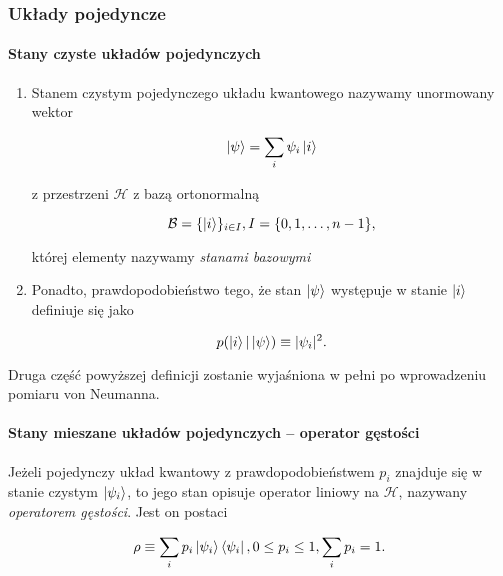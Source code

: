 \subsubsection{Układy pojedyncze}

\paragraph{Stany czyste układów pojedynczych}

\begin{definition}
    \strut
    \begin{enumerate}
        \item Stanem czystym pojedynczego układu kwantowego nazywamy unormowany wektor

            $$
                \ket{\psi} = \sum\limits_{i} \psi_{i} \ket{i}
            $$
 
            z przestrzeni $\mathcal{H}$ z bazą ortonormalną

            $$
                \mathcal{B} = \{\ket{i}\}_{i \in I}, I = \{0, 1, \ldots, n - 1\},
            $$

            której elementy nazywamy \textit{stanami bazowymi}

        \item Ponadto, prawdopodobieństwo tego, że stan $\ket{\psi}$ występuje w stanie $\ket{i}$ definiuje się jako

            \begin{equation}
                \label{equation:finding}
                p(\ket{i}|\ket{\psi}) \equiv |\psi_i| ^ 2.
            \end{equation}
    \end{enumerate}
\end{definition}

\begin{remark}
    Druga część powyższej definicji zostanie wyjaśniona w pełni po wprowadzeniu pomiaru von Neumanna.
\end{remark}

\paragraph{Stany mieszane układów pojedynczych -- operator gęstości}

\begin{definition}
    Jeżeli pojedynczy układ kwantowy z prawdopodobieństwem $p_i$ znajduje się w stanie czystym $\ket{\psi_i}$, to jego stan opisuje operator liniowy na $\mathcal{H}$, nazywany \textit{operatorem gęstości}. Jest on postaci

    $$
        \rho \equiv \sum\limits_{i} p_i \ket{\psi_i} \bra{\psi_i}, 0 \leq p_i \leq 1, \sum\limits_{i} p_i = 1.
    $$
\end{definition}

